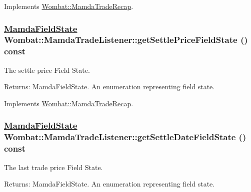 Implements \hyperlink{classWombat_1_1MamdaTradeRecap_f8812af3a07b9b5da681289918a38f73}{Wombat::Mamda\-Trade\-Recap}.\hypertarget{classWombat_1_1MamdaTradeListener_f487197ee5cad3e13470e8363e667702}{
\subsubsection[getSettlePriceFieldState]{\setlength{\rightskip}{0pt plus 5cm}\hyperlink{namespaceWombat_93aac974f2ab713554fd12a1fa3b7d2a}{Mamda\-Field\-State} Wombat::Mamda\-Trade\-Listener::get\-Settle\-Price\-Field\-State () const}}
\label{classWombat_1_1MamdaTradeListener_f487197ee5cad3e13470e8363e667702}


The settle price Field State. 

\begin{Desc}
\item[Returns:]Mamda\-Field\-State. An enumeration representing field state. \end{Desc}


Implements \hyperlink{classWombat_1_1MamdaTradeRecap_a2424806f6356557b09ee35c4fc5c573}{Wombat::Mamda\-Trade\-Recap}.\hypertarget{classWombat_1_1MamdaTradeListener_75af0c0e81cb87dcf0029f79ecb13262}{
\subsubsection[getSettleDateFieldState]{\setlength{\rightskip}{0pt plus 5cm}\hyperlink{namespaceWombat_93aac974f2ab713554fd12a1fa3b7d2a}{Mamda\-Field\-State} Wombat::Mamda\-Trade\-Listener::get\-Settle\-Date\-Field\-State () const}}
\label{classWombat_1_1MamdaTradeListener_75af0c0e81cb87dcf0029f79ecb13262}


The last trade price Field State. 

\begin{Desc}
\item[Returns:]Mamda\-Field\-State. An enumeration representing field state. \end{Desc}



